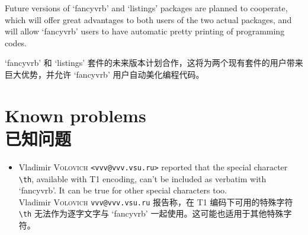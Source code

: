 \documentclass[twoside]{article}
\newcommand\FVrbPackage{`\textsf{fancyvrb}'}
\begin{document}
\begin{changebar}
Future versions of \FVrbPackage{} and `\textsf{listings}' packages are
planned to cooperate, which will offer great advantages to both users of the
two actual packages, and will allow \FVrbPackage{} users to have automatic
pretty printing of programming codes.

\FVrbPackage{} 和 `\textsf{listings}' 套件的未来版本计划合作，这将为两个现有套件的用户带来巨大优势，并允许 \FVrbPackage{} 用户自动美化编程代码。





\section{Known problems\\已知问题}
  
\begin{itemize}
  \item Vladimir \textsc{Volovich} \verb+<vvv@vvv.vsu.ru>+ reported that the
  special character \verb+\th+, available with T1 encoding, can't be
  included as verbatim with \FVrbPackage. It can be true for other special
  characters too.
\\Vladimir \textsc{Volovich} \verb+vvv@vvv.vsu.ru+ 报告称，在 T1 编码下可用的特殊字符 \verb+\th+ 无法作为逐字文字与 \FVrbPackage{} 一起使用。这可能也适用于其他特殊字符。
\end{itemize}  
  


\end{changebar}
\end{document}
